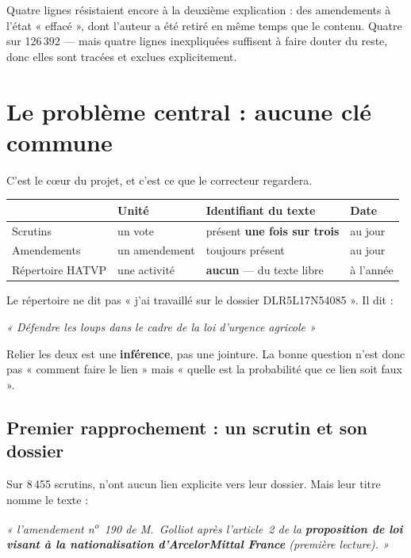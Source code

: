 \documentclass[11pt,a4paper]{article}
\begin{document}
Quatre lignes résistaient encore à la deuxième explication : des amendements à l'état
« effacé », dont l'auteur a été retiré en même temps que le contenu. Quatre sur 126\,392 ---
mais quatre lignes inexpliquées suffisent à faire douter du reste, donc elles sont
tracées et exclues explicitement.

\newpage
\section{Le problème central : aucune clé commune}

C'est le cœur du projet, et c'est ce que le correcteur regardera.

\begin{center}
\small
\begin{tabular}{@{}lllp{}@{}}
\toprule
& \textbf{Unité} & \textbf{Identifiant du texte} & \textbf{Date} \\
\midrule
Scrutins & un vote & présent \textbf{une fois sur trois} & au jour \\
Amendements & un amendement & toujours présent & au jour \\
Répertoire HATVP & une activité & \textbf{aucun} --- du texte libre & à l'année \\
\bottomrule
\end{tabular}
\end{center}

Le répertoire ne dit pas « j'ai travaillé sur le dossier DLR5L17N54085 ». Il dit :

\begin{center}
\itshape\small « Défendre les loups dans le cadre de la loi d'urgence agricole »
\end{center}

Relier les deux est une \textbf{inférence}, pas une jointure. La bonne question n'est donc
pas « comment faire le lien » mais « quelle est la probabilité que ce lien soit faux ».

\subsection{Premier rapprochement : un scrutin et son dossier}

Sur 8\,455 scrutins,  n'ont aucun lien explicite vers leur dossier. Mais
leur titre nomme le texte :

\begin{center}
\small\itshape
« l'amendement n\textsuperscript{o}~190 de M.~Golliot après l'article~2 de la
\textbf{proposition de loi visant à la nationalisation d'ArcelorMittal France}
(première lecture). »
\end{center}
\end{document}
